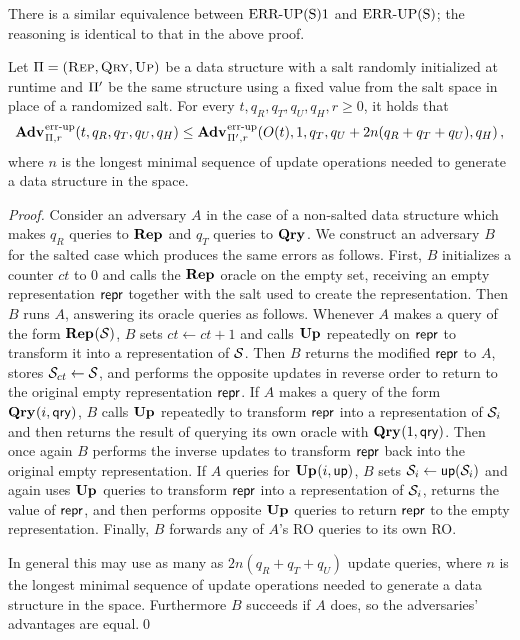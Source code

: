 There is a similar equivalence between $\textnormal{ERR\mbox{-}UP(S)}1$ and $\textnormal{ERR\mbox{-}UP(S)}$; the reasoning is identical to that in the above proof.

\begin{lemma}\label{lemma:noinvsalt}
  Let $\mathrm{\Pi} = (\textsc{Rep}, \textsc{Qry}, \textsc{Up})$ be a data structure with a salt randomly initialized at runtime and $\mathrm{\Pi}'$ be the same structure using a fixed value from the salt space in place of a randomized salt. For every $t, q_R, q_T, q_U, q_H, r\geq 0$, it holds that
  \[
    \Adv{\errep}_{\struct,r}(t, q_R, q_T, q_U, q_H) \leq
    \Adv{\errep}_{\struct',r}(O(t), 1, q_T, q_U+2n(q_R+q_T+q_U), q_H) \,,
  \]
  where $n$ is the longest minimal sequence of update operations needed to generate a data structure in the space.
\end{lemma}
\begin{proof}
Consider an adversary $A$ in the case of a non-salted data structure which makes $q_R$ queries to $\mathbf{Rep}\hspace{0.5pt}$ and $q_T$ queries to $\mathbf{Qry}\hspace{0.5pt}$. We construct an adversary $B$ for the salted case which produces the same errors as follows. First, $B$ initializes a counter $ct$ to 0 and calls the $\mathbf{Rep}\hspace{0.5pt}$ oracle on the empty set, receiving an empty representation $\mathsf{repr}$ together with the salt used to create the representation. Then $B$ runs $A$, answering its oracle queries as follows. Whenever $A$ makes a query of the form $\mathbf{Rep}\hspace{0.5pt}(\mathcal{S})$, $B$ sets $ct \gets ct + 1$ and calls $\mathbf{Up}\hspace{0.5pt}$ repeatedly on $\mathsf{repr}$ to transform it into a representation of $\mathcal{S}$. Then $B$ returns the modified $\mathsf{repr}$ to $A$, stores $\mathcal{S}_{ct} \gets \mathcal{S}$, and performs the opposite updates in reverse order to return to the original empty representation $\mathsf{repr}$. If $A$ makes a query of the form $\mathbf{Qry}\hspace{0.5pt}(i,\mathsf{qry})$, $B$ calls $\mathbf{Up}\hspace{0.5pt}$ repeatedly to transform $\mathsf{repr}$ into a representation of $\mathcal{S}_i$ and then returns the result of querying its own oracle with $\mathbf{Qry}\hspace{0.5pt}(1, \mathsf{qry})$. Then once again $B$ performs the inverse updates to transform $\mathsf{repr}$ back into the original empty representation. If $A$ queries for $\mathbf{Up}\hspace{0.5pt}(i, \mathsf{up})$, $B$ sets $\mathcal{S}_i \gets \mathsf{up}(\mathcal{S}_i)$ and again uses $\mathbf{Up}\hspace{0.5pt}$ queries to transform $\mathsf{repr}$ into a representation of $\mathcal{S}_i$, returns the value of $\mathsf{repr}$, and then performs opposite $\mathbf{Up}\hspace{0.5pt}$ queries to return $\mathsf{repr}$ to the empty representation. Finally, $B$ forwards any of $A$'s RO queries to its own RO.

In general this may use as many as $2n(q_R+q_T+q_U)$ update queries, where $n$ is the longest minimal sequence of update operations needed to generate a data structure in the space. Furthermore $B$ succeeds if $A$ does, so the adversaries' advantages are equal.\hfill\qed
\end{proof}

